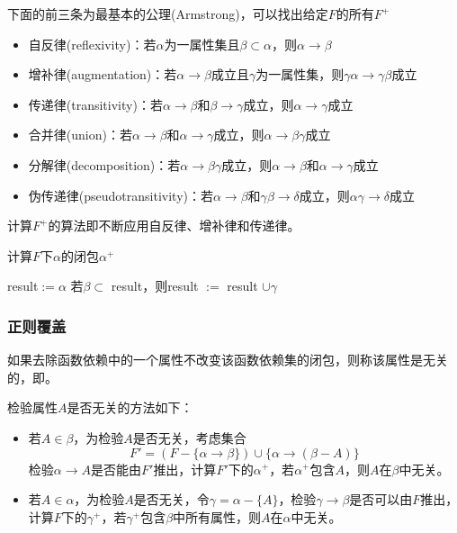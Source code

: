 \begin{theorem}[逻辑蕴含公理]
下面的前三条为最基本的公理(Armstrong)，可以找出给定$F$的所有$F^+$
\begin{itemize}
	\item 自反律(reflexivity)：若$\alpha$为一属性集且$\beta\subset\alpha$，则$\alpha\to\beta$
	\item 增补律(augmentation)：若$\alpha\to\beta$成立且$\gamma$为一属性集，则$\gamma\alpha\to\gamma\beta$成立
	\item 传递律(transitivity)：若$\alpha\to\beta$和$\beta\to\gamma$成立，则$\alpha\to\gamma$成立
	\item 合并律(union)：若$\alpha\to\beta$和$\alpha\to\gamma$成立，则$\alpha\to\beta\gamma$成立
	\item 分解律(decomposition)：若$\alpha\to\beta\gamma$成立，则$\alpha\to\beta$和$\alpha\to\gamma$成立
	\item 伪传递律(pseudotransitivity)：若$\alpha\to\beta$和$\gamma\beta\to\delta$成立，则$\alpha\gamma\to\delta$成立
\end{itemize}
\end{theorem}
计算$F^+$的算法即不断应用自反律、增补律和传递律。

\begin{algorithm}
\caption{计算$F$下$\alpha$的闭包$\alpha^+$}
\begin{algorithmic}[1]
\State result$:=\alpha$
\Repeat
{}
\State 若$\beta\subset$ result，则result $:=$ result $\cup\gamma$
\EndFor
{}
\end{algorithmic}
\end{algorithm}

\subsubsection{正则覆盖}
\begin{definition}[无关(extraneous)]
如果去除函数依赖中的一个属性不改变该函数依赖集的闭包，则称该属性是无关的，即。
\end{definition}

检验属性$A$是否无关的方法如下：
\begin{itemize}
	\item 若$A\in\beta$，为检验$A$是否无关，考虑集合
	\[F'=(F-\{\alpha\to\beta\})\cup\{\alpha\to(\beta-A)\}\]
	检验$\alpha\to A$是否能由$F'$推出，计算$F'$下的$\alpha^+$，若$\alpha^+$包含$A$，则$A$在$\beta$中无关。
	\item 若$A\in\alpha$，为检验$A$是否无关，令$\gamma=\alpha-\{A\}$，检验$\gamma\to\beta$是否可以由$F$推出，
	计算$F$下的$\gamma^+$，若$\gamma^+$包含$\beta$中所有属性，则$A$在$\alpha$中无关。
\end{itemize}

